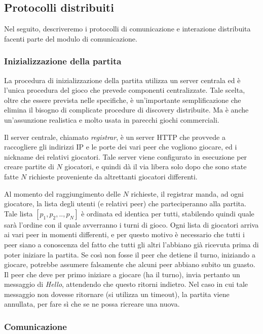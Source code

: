 \documentclass[10.5pt]{article}
\begin{document}
\subsection{Protocolli distribuiti}
Nel seguito, descriveremo i protocolli di comunicazione e interazione distribuita facenti parte del modulo di comunicazione.

\subsubsection{Inizializzazione della partita}

La procedura di inizializzazione della partita utilizza un server centrala ed è l'unica procedura del gioco che prevede componenti centralizzate. Tale scelta, oltre che essere prevista nelle specifiche, è un'importante semplificazione che elimina il bisogno di complicate procedure di discovery distribuite. Ma è anche un'assunzione realistica e molto usata in parecchi giochi commerciali.

Il server centrale, chiamato \textit{registrar}, è un server HTTP che provvede a raccogliere gli indirizzi IP e le porte dei vari peer che vogliono giocare, ed i nickname dei relativi giocatori. Tale server viene configurato in esecuzione per creare partite di $N$ giocatori, e quindi dà il via libera solo dopo che sono state fatte $N$ richieste proveniente da altrettanti giocatori differenti.

Al momento del raggiungimento delle $N$ richieste, il registrar manda, ad ogni giocatore, la lista degli utenti (e relativi peer) che parteciperanno alla partita. Tale lista $[p_1, p_2, .., p_N]$ è ordinata ed identica per tutti, stabilendo quindi quale sarà l'ordine con il quale avverranno i turni di gioco. Ogni lista di giocatori arriva ai vari peer in momenti differenti, e per questo motivo è necessario che tutti i peer siano a conoscenza del fatto che tutti gli altri l'abbiano già ricevuta prima di poter iniziare la partita. Se così non fosse il peer che detiene il turno, iniziando a giocare, potrebbe assumere falsamente che alcuni peer abbiano subito un guasto. Il peer che deve per primo iniziare a giocare (ha il turno), invia pertanto un messaggio di \textit{Hello}, attendendo che questo ritorni indietro. Nel caso in cui tale messaggio non dovesse ritornare (si utilizza un timeout), la partita viene annullata, per fare sì che se ne possa ricreare una nuova. 

\subsubsection{Comunicazione}
\end{document}
